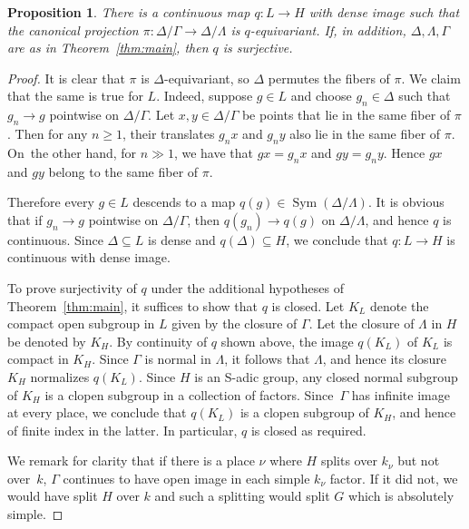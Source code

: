 \documentclass[JEP,XML,SOM,Unicode,published]{cedram}
\DeclareMathOperator{\Sym}{Sym}
\newtheorem{prop}[thm]{Proposition}
\theoremstyle{definition}
\begin{document}
\begin{prop}\label{prop-contclosed}\label{prop:LtoH}
There is a continuous map $q:L\to H$ with dense image such that the canonical projection $\pi: \Delta / \Gamma\to \Delta / \Lambda$ is $q$-equivariant.
If, in addition, $\Delta, \Lambda, \Gamma$ are as in Theorem~\ref{thm:main}, then $q$ is surjective.
\end{prop}
\begin{proof} It is clear that $\pi$ is $\Delta$-equivariant, so $\Delta$ permutes the fibers of $\pi$. We claim that the same is true for $L$. Indeed, suppose $g\in L$ and choose $g_n\in\Delta$ such that $g_n\to g$ pointwise on $\Delta/\Gamma$. Let $x,y\in\Delta/\Gamma$ be points that lie in the same fiber of $\pi$. Then for any $n\geq 1$, their translates $g_n x$ and $g_n y$ also lie in the same fiber of $\pi$. On~the other hand, for $n \gg 1$, we have that $g x = g_n x$ and $g y = g_n y$. Hence $gx$ and $gy$ belong to the same fiber of $\pi$.

Therefore every $g\in L$ descends to a map $q(g)\in \Sym(\Delta/\Lambda)$. It is obvious that if $g_n\to g$ pointwise on $\Delta/\Gamma$, then $q(g_n)\to q(g)$ on $\Delta/\Lambda$, and hence $q$ is continuous. Since $\Delta\subseteq L$ is dense and $q(\Delta)\subseteq H$, we conclude that $q:L\to H$ is continuous with dense image.

To prove surjectivity of $q$ under the additional hypotheses of
Theorem~\ref{thm:main}, it suffices to show that $q$ is closed.
Let $K_L$ denote the compact open subgroup in $L$ given by the closure of $\Gamma$. Let the closure of $\Lambda$ in $H$ be denoted by $K_H$.
By continuity of $ q$ shown above, the image $q(K_L)$ of $K_L$ is compact in $K_H$.
Since $\Gamma$ is normal in $\Lambda$, it follows that $\Lambda$, and hence its closure $K_H$
normalizes $q(K_L)$.
Since $H$ is an S-adic group, any closed normal subgroup of $K_H$ is a clopen subgroup in a collection of factors. Since~$\Gamma$ has infinite image at every place, we conclude that $q(K_L)$ is a clopen subgroup of $K_H$, and hence
of finite index in the latter. In particular, $q$ is closed as required.

We remark for clarity that if there is a place $\nu$ where $H$ splits over $k_{\nu}$ but not over~$k$, $\Gamma$ continues to have open image in each simple $k_{\nu}$ factor. If it did not, we would have split $H$ over $k$ and such a splitting would split $G$ which is absolutely simple.
\end{proof}
\end{document}
